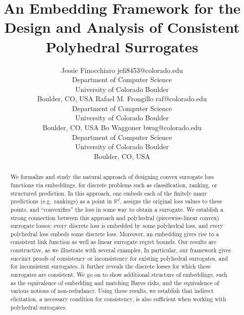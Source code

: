 \documentclass[twoside,11pt]{article}
\newcommand{\reals}{\mathbb{R}}
\begin{document}
\title{An Embedding Framework for the Design and Analysis of Consistent Polyhedral Surrogates}
\author{\name Jessie Finocchiaro \email jefi8453@colorado.edu \\
	\addr Department of Computer Science\\
	University of Colorado Boulder\\
	Boulder, CO, USA
	\AND
	\name Rafael M. Frongillo \email raf@colorado.edu \\
	\addr Department of Computer Science\\
	University of Colorado Boulder\\
	Boulder, CO, USA
	\AND
	\name Bo Waggoner \email bwag@colorado.edu \\
	\addr Department of Computer Science\\
	University of Colorado Boulder\\
	Boulder, CO, USA
}


\maketitle

\begin{abstract}%
  We formalize and study the natural approach of designing convex surrogate loss functions via embeddings, for discrete problems such as classification, ranking, or structured prediction. 
  In this approach, one embeds each of the finitely many predictions (e.g.\ rankings) as a point in $\reals^d$, assigns the original loss values to these points, and ``convexifies'' the loss in some way to obtain a surrogate.
  We establish a strong connection between this approach and polyhedral (piecewise-linear convex) surrogate losses:
  every discrete loss is embedded by some polyhedral loss, and every polyhedral loss embeds some discrete loss.
  Moreover, an embedding gives rise to a consistent link function as well as linear surrogate regret bounds.
  Our results are constructive, as we illustrate with several examples.
  In particular, our framework gives succinct proofs of consistency or inconsistency for existing polyhedral surrogates, and for inconsistent surrogates, it further reveals the discrete losses for which these surrogates are consistent.
  We go on to show additional structure of embeddings, such as the equivalence of embedding and matching Bayes risks, and the equivalence of various notions of non-redudancy.
  Using these results, we establish that indirect elicitation, a necessary condition for consistency, is also sufficient when working with polyhedral surrogates.
\end{abstract}
\end{document}
